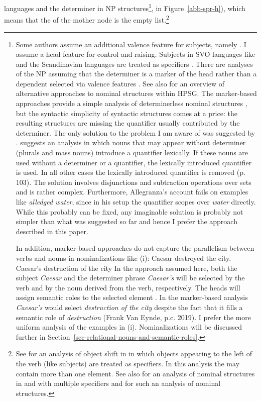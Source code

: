 \documentclass[output=paper
  ,nobabel
  ,draftmode
  ,uniformtopskip %
  ,colorlinks, citecolor=brown
]{langscibook}
\begin{document}
languages and the determiner in NP structures\footnote{%
  Some authors assume an additional valence feature for subjects, namely \subj \parencites{Borsley87a}[Chapter~9]{ps2}. I assume a head feature
  \subj for control and raising. Subjects in SVO languages like  and the Scandinavian
  languages are treated as specifiers \citep{MuellerGermanic}. There are analyses of the NP assuming
  that the determiner is a marker of the head rather than a dependent selected via valence features
  \citep{VanEynde2006b,Allegranza2007a-u,Sag2012a}. See also  for an
  overview of alternative approaches to nominal structures within HPSG. 
  The marker-based approaches provide a simple analysis of determinerless nominal structures
  \citep[, 174--175]{VanEynde2006b}, but the syntactic simplicity of syntactic structures
  comes at a price: the resulting structures are missing the quantifier usually contributed by the
  determiner. The only solution to the problem I am aware of was suggested by
  \citet{Allegranza98a-u}. \citet{Allegranza98a-u} suggests an analysis in which nouns that may appear
  without determiner (plurals and mass nouns) introduce a quantifier lexically. If these nouns are
  used without a determiner or a quantifier, the lexically introduced quantifier is used. In all
  other cases the lexically introduced quantifier is removed (p.\,103). The solution involves
  disjunctions and subtraction operations over sets and is rather complex. Furthermore, Allegranza's account fails
  on examples like \emph{alledged water}, since in his setup the quantifier scopes over \emph{water}
  directly. While this probably can be fixed, any imaginable solution is probably not simpler than
  what was suggested so far and hence I prefer the approach described in this paper.

In addition, marker-based approaches do not capture the parallelism between verbs and nouns in nominalizations like (i):
\eal
\ex Caesar destroyed the city.
\ex Caesar's destruction of the city
\zl
In the approach assumed here, both the subject \emph{Caesar} and the determiner phrase \emph{Caesar's} will be selected by the
verb and by the noun derived from the verb, respectively. The heads will assign semantic roles to
the selected element \citep{MyPM2021a}. In the marker-based analysis
\emph{Caesar's} would select \emph{destruction of the city} despite the fact that it fills a
semantic role of \emph{destruction} (Frank Van Eynde, p.c. 2019). I prefer the more uniform analysis of
the examples in (i). Nominalizations will be discussed further in Section~\ref{sec-relational-nouns-and-semantic-roles}.
},  in Figure~\ref{abb-spr-h}), which means that the \sprl of the mother node is the empty
list.\footnote{%
  See \citet{MOe2013b} for an analysis of object shift in  in which objects appearing to the
  left of the verb (like subjects) are treated as specifiers. In this analysis the \sprl may contain
  more than one element. See also  for an analysis of nominal
structures in  and  with multiple specifiers and  for such an
analysis of  nominal structures.
}
\end{document}

